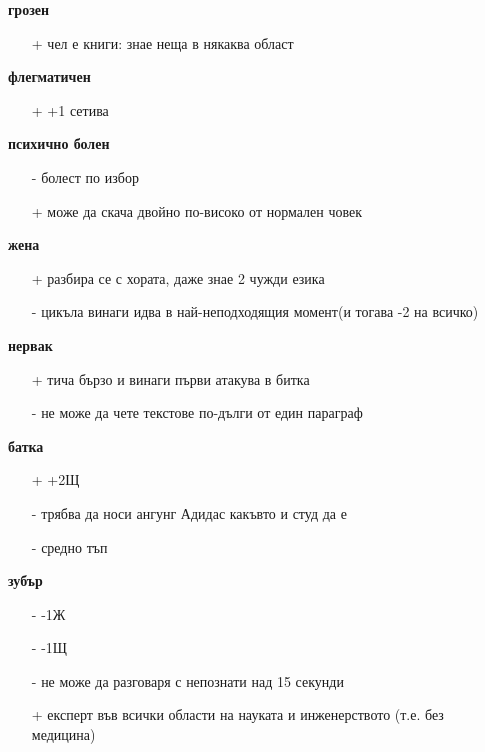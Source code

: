 \documentclass{article}
\begin{document}
\textbf{грозен}
\begin{itemize}                                                                 
\item[+] чел е книги: знае неща в някаква област  \\
\end{itemize}

\textbf{флегматичен}
\begin{itemize}                                                                 
\item[+] +1 сетива  \\
\end{itemize}


\textbf{психично болен}
\begin{itemize}
\item[-] болест по избор
\item[+] може да скача двойно по-високо от нормален човек  \\
\end{itemize}

\textbf{жена}
\begin{itemize}
\item[+] разбира се с хората, даже знае 2 чужди езика
\item[-] цикъла винаги идва в най-неподходящия момент(и тогава -2 на всичко)  \\
\end{itemize}

\textbf{нервак}
\begin{itemize}
\item[+] тича бързо и винаги първи атакува в битка
\item[-] не може да чете текстове по-дълги от един параграф  \\
\end{itemize}

\textbf{батка}
\begin{itemize}
\item[+] +2Щ
\item[-] трябва да носи ангунг Адидас какъвто и студ да е
\item[-] средно тъп  \\
\end{itemize}

\textbf{зубър}
\begin{itemize}
\item[-] -1Ж
\item[-] -1Щ
\item[-] не може да разговаря с непознати над 15 секунди
\item[+] експерт във всички области на науката и инженерството (т.е. без медицина)  \\
\end{itemize}
\end{document}
